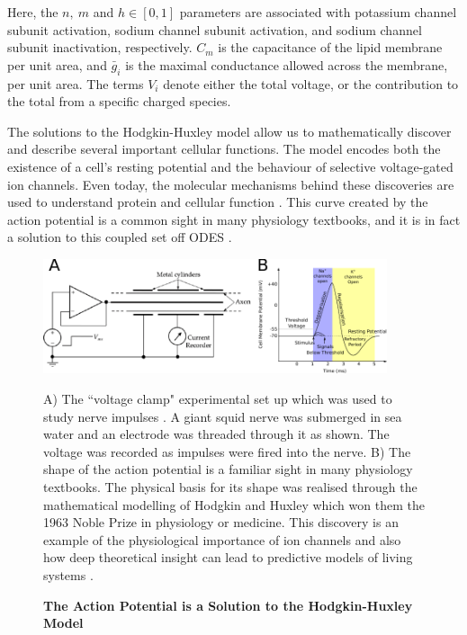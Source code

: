 Here, the $n,\ m$ and $h \in [0,1]$ parameters are associated with potassium channel subunit activation, sodium channel subunit activation, and sodium channel subunit inactivation, respectively. $C_m$ is the capacitance of the lipid membrane per unit area, and $\bar{g}_i$ is the maximal conductance allowed across the membrane, per unit area. The terms $V_i$ denote either the total voltage, or the contribution to the total from a specific charged species. 

The solutions to the Hodgkin-Huxley model allow us to mathematically discover and describe several important cellular functions. The model encodes both the existence of a cell's resting potential and the behaviour of selective voltage-gated ion channels. Even today, the molecular mechanisms behind these discoveries are used to understand protein and cellular function \cite{aidley1996}. This curve created by the action potential is a common sight in many physiology textbooks, and it is in fact a solution to this coupled set off ODES \cite{pollard2016}.

\begin{figure}
	\begin{center}
		\includegraphics[width=0.9\textwidth]{figures/Hodgkin-Huxley_action_potential.pdf}
	\end{center}
	\captionsetup{singlelinecheck = false, justification=raggedright}
	\caption[The Action Potential is a Solution to the Hodkin-Huxley Model] {\textbf{The Action Potential is a Solution to the Hodgkin-Huxley Model }}{ A) The ``voltage clamp" experimental set up which was used to study nerve impulses \cite{hodgkin_huxley_figure_website}. A giant squid nerve was submerged in sea water and an electrode was threaded through it as shown. The voltage was recorded as impulses were fired into the nerve. B) The shape of the action potential is a familiar sight in many physiology textbooks. The physical basis for its shape was realised through the mathematical modelling of Hodgkin and Huxley which won them the 1963 Noble Prize in physiology or medicine. This discovery is an example of the physiological importance of ion channels and also how deep theoretical insight can lead to predictive models of living systems \cite{hodgkin1952, hodgkin1952a, hodgkin1952b, hodgkin1952c, hodgkin1952d}.}
	\label{action_potential_graphic}
\end{figure}

